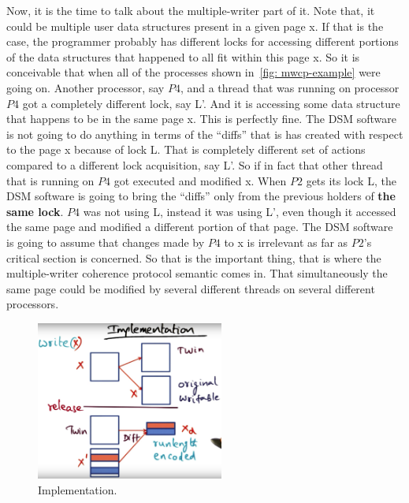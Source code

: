 \documentclass[11pt]{lecture}
\def\fullsize{0.55\textwidth}
\begin{document}
Now, it is the time to talk about the multiple-writer part of it. Note that, it could be multiple user 
data structures present in a given page {\code x}. If that is the case, the programmer probably 
has different locks for accessing different portions of the data structures that happened to all 
fit within this page {\code x}. So it is conceivable that when all of the processes shown 
in~\autoref{fig: mwcp-example} were going on. Another processor, say $P4$, and a thread that was running on processor 
$P4$ got a completely different lock, say {\code L'}. And it is accessing some data structure 
that happens to be in the same page {\code x}. This is perfectly fine. The DSM software is 
not going to do anything in terms of the ``diffs'' that is has created with respect to the 
page {\code x} because of lock {\code L}. That is completely different set of actions compared to a different 
lock acquisition, say {\code L'}. So if in fact that other thread that is running on $P4$ 
got executed and modified {\code x}. When $P2$ gets its lock {\code L}, the DSM 
software is going to bring the ``diffs'' only from the previous holders of {\bf the same lock}. 
$P4$ was not using {\code L}, instead it was using {\code L'}, even though it accessed the same page 
and modified a different portion of that page. The DSM software is going to assume 
that changes made by $P4$ to {\code x} is irrelevant as far as $P2$'s critical section is concerned. 
So that is the important thing, that is where the multiple-writer coherence protocol semantic comes 
in. That simultaneously the same page could be modified by several different threads on several different 
processors. 


\begin{figure}
\centering
\includegraphics[width=\fullsize]{Figures/impl}
\caption{Implementation.}\label{fig: impl}
\end{figure}
\end{document}
